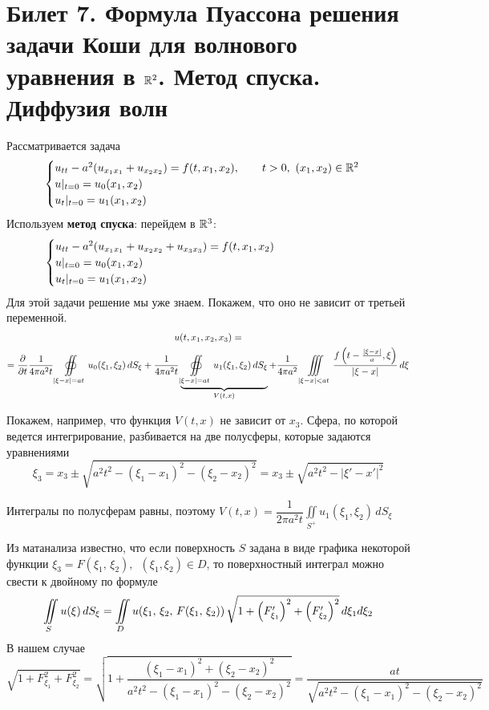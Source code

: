 \documentclass[../main.tex]{subfiles}
\begin{document}
\section{Билет 7. Формула Пуассона решения задачи Коши для волнового уравнения в \texorpdfstring{$\mathbb{R}^2$}{R\textasciicircum 2}. Метод спуска. Диффузия волн}
Рассматривается задача
\begin{equation}
\label{eq::7::cauchy}
\begin{cases}
  u_{tt}-a^2(u_{x_1x_1}+u_{x_2x_2})=f(t,x_1,x_2),\qquad t>0,\ (x_1, x_2)\in \mathbb{R}^2\\
  u|_{t=0}=u_0(x_1, x_2)\\ 
  u_t|_{t=0}=u_1(x_1, x_2)
\end{cases}
\end{equation}
Используем \textbf{метод спуска}: перейдем в $\mathbb{R}^3$:
\begin{equation*}
\begin{cases}
  u_{tt}-a^2(u_{x_1x_1}+u_{x_2x_2}+u_{x_3x_3})=f(t,x_1,x_2) \hspace{7.5em}\\
  u|_{t=0}=u_0(x_1, x_2)\\
  u_t|_{t=0}=u_1(x_1, x_2)
\end{cases}
\end{equation*}
Для этой задачи решение мы уже знаем. Покажем, что оно не зависит от третьей переменной.
\begin{multline*}
u(t, x_1, x_2, x_3) = \\
= \frac{\partial }{\partial t} \frac{1}{4\pi a^2t} \oiint\limits_{|\xi-x|=at} u_0(\xi_1, \xi_2)\, dS_\xi 
+\frac{1}{4\pi a^2t}\underbrace{\oiint\limits_{|\xi-x|=at} u_1(\xi_1, \xi_2)\, dS_{\xi}}_{V(t,x)}
+\frac{1}{4\pi a^2}\iiint\limits_{|\xi - x|<at}\frac{f\left(t-\frac{|\xi - x|}{a}, \xi \right)}{|\xi - x|}\, d\xi
\end{multline*}

Покажем, например, что функция $V(t,x)$ не зависит от $x_3$. Сфера, по которой ведется интегрирование, разбивается на две полусферы, которые задаются уравнениями
$$\xi_3=x_3\pm \sqrt{a^2t^2-(\xi_1 -x_1)^2-(\xi_2 -x_2)^2}=x_3\pm \sqrt{a^2t^2-|\xi '-x'|^2}$$

Интегралы по полусферам равны, поэтому $V(t,x)=\dfrac{1}{2\pi a^2t}\displaystyle\iint\limits_{S^+}u_1(\xi_1, \xi_2)\, dS_{\xi}$

Из матанализа известно, что если поверхность $S$ задана в виде графика некоторой функции $\xi_3=F(\xi_1,\, \xi_2),\;\ (\xi_1, \xi_2)\in D$, то поверхностный интеграл можно свести к двойному по формуле
\[
\iint\limits_S u(\xi )\, dS_{\xi}=\iint\limits_D u(\xi_1,\, \xi_2,\, F(\xi_1,\, \xi_2))\, 
\sqrt{1 + \left(F'_{\xi_1}\right)^2 + \left(F'_{\xi_2}\right)^2}\, d\xi_1 d\xi_2
\]
В нашем случае 
$$\sqrt{1+F_{\xi_1}^2+F_{\xi_2}^2}=\sqrt{1+\dfrac{(\xi_1 - x_1)^2+(\xi_2 - x_2)^2}{a^2t^2 - (\xi_1 - x_1)^2-(\xi_2 - x_2)^2}}=\dfrac{at}{\sqrt{a^2t^2 - (\xi_1 - x_1)^2-(\xi_2 - x_2)^2}}$$
\end{document}

